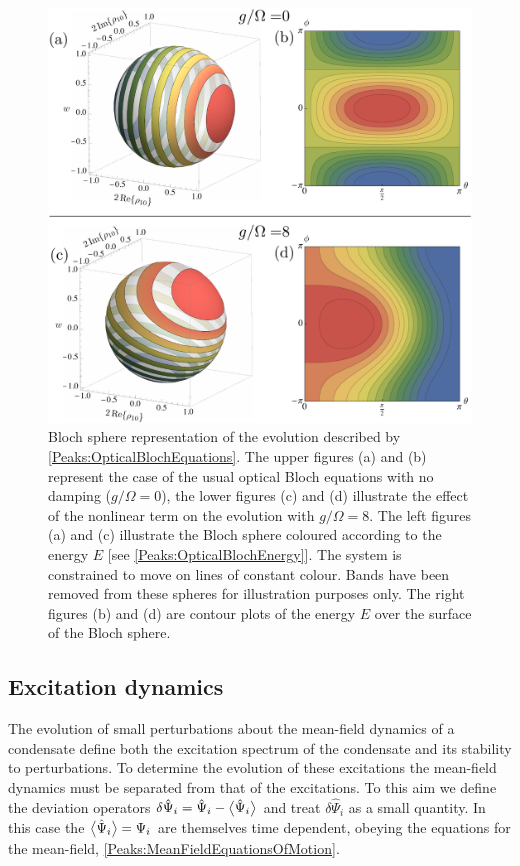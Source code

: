 \begin{figure}
    \centering
    \includegraphics[width=14cm]{BlochSpheres}
    \caption{Bloch sphere representation of the evolution described by \eqref{Peaks:OpticalBlochEquations}. The upper figures (a) and (b) represent the case of the usual optical Bloch equations with no damping ($g/\Omega=0$), the lower figures (c) and (d) illustrate the effect of the nonlinear term on the evolution with $g/\Omega = 8$. The left figures (a) and (c) illustrate the Bloch sphere coloured according to the energy $E$ [see \eqref{Peaks:OpticalBlochEnergy}]. The system is constrained to move on lines of constant colour. Bands have been removed from these spheres for illustration purposes only. The right figures (b) and (d) are contour plots of the energy $E$ over the surface of the Bloch sphere.
     \label{Peaks:BlochSphere}}
\end{figure}

\subsection{Excitation dynamics}

The evolution of small perturbations about the mean-field dynamics of a condensate define both the excitation spectrum of the condensate and its stability to perturbations. 
To determine the evolution of these excitations the mean-field dynamics must be separated from that of the excitations. To this aim we define the deviation operators $\delta\hat{\Psi}_i = \hat{\Psi}_i - {\big<\hat{\Psi}_i\big>}$ and treat $\delta\hat{\Psi}_i$ as a small quantity. In this case the ${\big<\hat{\Psi}_i\big>}=\Psi_i$ are themselves time dependent, obeying the equations for the mean-field, \eqref{Peaks:MeanFieldEquationsOfMotion}.

